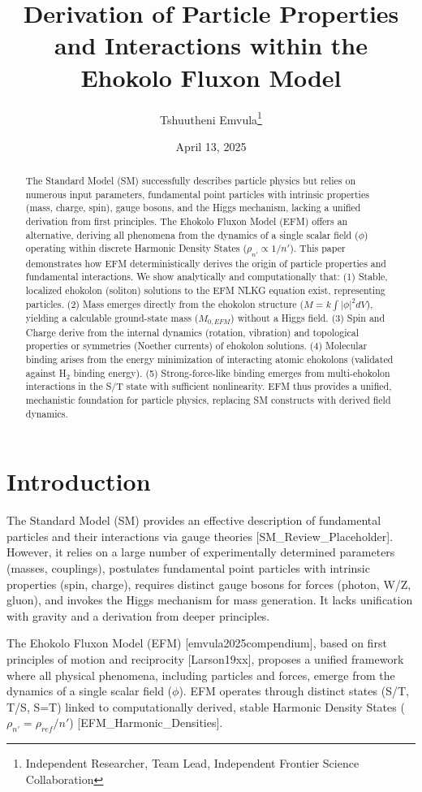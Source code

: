 \documentclass[11pt]{article}
\title{Derivation of Particle Properties and Interactions within the Ehokolo Fluxon Model}
\author{Tshuutheni Emvula\thanks{Independent Researcher, Team Lead, Independent Frontier Science Collaboration}}
\date{April 13, 2025}
\begin{document}
\maketitle

\begin{abstract}
The Standard Model (SM) successfully describes particle physics but relies on numerous input parameters, fundamental point particles with intrinsic properties (mass, charge, spin), gauge bosons, and the Higgs mechanism, lacking a unified derivation from first principles. The Ehokolo Fluxon Model (EFM) offers an alternative, deriving all phenomena from the dynamics of a single scalar field (\(\phi\)) operating within discrete Harmonic Density States (\(\rho_{n'} \propto 1/n'\)). This paper demonstrates how EFM deterministically derives the origin of particle properties and fundamental interactions. We show analytically and computationally that: (1) Stable, localized ehokolon (soliton) solutions to the EFM NLKG equation exist, representing particles. (2) Mass emerges directly from the ehokolon structure (\(M = k \int |\phi|^2 dV\)), yielding a calculable ground-state mass (\(M_{0, EFM}\)) without a Higgs field. (3) Spin and Charge derive from the internal dynamics (rotation, vibration) and topological properties or symmetries (Noether currents) of ehokolon solutions. (4) Molecular binding arises from the energy minimization of interacting atomic ehokolons (validated against H\(_2\) binding energy). (5) Strong-force-like binding emerges from multi-ehokolon interactions in the S/T state with sufficient nonlinearity. EFM thus provides a unified, mechanistic foundation for particle physics, replacing SM constructs with derived field dynamics.
\end{abstract}

\section{Introduction}
The Standard Model (SM) provides an effective description of fundamental particles and their interactions via gauge theories [SM\_Review\_Placeholder]. However, it relies on a large number of experimentally determined parameters (masses, couplings), postulates fundamental point particles with intrinsic properties (spin, charge), requires distinct gauge bosons for forces (photon, W/Z, gluon), and invokes the Higgs mechanism for mass generation. It lacks unification with gravity and a derivation from deeper principles.

The Ehokolo Fluxon Model (EFM) [emvula2025compendium], based on first principles of motion and reciprocity [Larson19xx], proposes a unified framework where all physical phenomena, including particles and forces, emerge from the dynamics of a single scalar field (\(\phi\)). EFM operates through distinct states (S/T, T/S, S=T) linked to computationally derived, stable Harmonic Density States (\(\rho_{n'} = \rho_{ref}/n'\)) [EFM\_Harmonic\_Densities].
\end{document}
